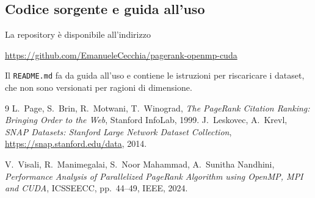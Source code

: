 \documentclass[11pt,a4paper]{article}
\begin{document}
\subsection{Codice sorgente e guida all'uso}
La repository è disponibile all'indirizzo
\begin{center}
\url{https://github.com/EmanueleCecchia/pagerank-openmp-cuda}
\end{center}
Il \texttt{README.md} fa da guida all'uso e contiene le istruzioni 
per riscaricare i dataset, che non sono versionati per ragioni di dimensione.

\begin{thebibliography}{9}
 L.~Page, S.~Brin, R.~Motwani, T.~Winograd,
  \emph{The PageRank Citation Ranking: Bringing Order to the Web},
  Stanford InfoLab, 1999.
 J.~Leskovec, A.~Krevl, \emph{SNAP Datasets: Stanford Large
  Network Dataset Collection}, \url{https://snap.stanford.edu/data}, 2014.

 V.~Visali, R.~Manimegalai, S.~Noor Mahammad,
  A.~Sunitha Nandhini, \emph{Performance Analysis of Parallelized PageRank
  Algorithm using OpenMP, MPI and CUDA}, ICSSEECC, pp.~44--49, IEEE, 2024.
\end{thebibliography}
\end{document}
